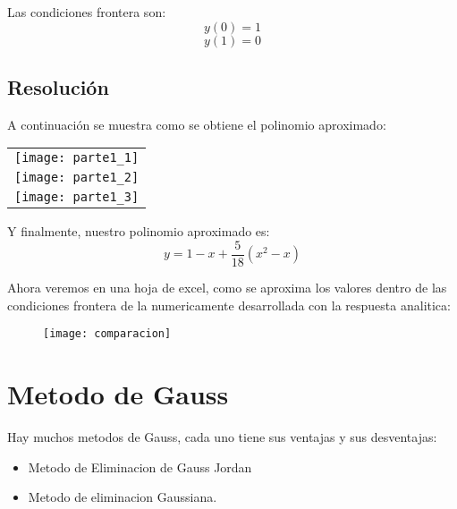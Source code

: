 \documentclass[a4paper,12pt]{article}
\begin{document}
Las condiciones frontera son:
$$y(0) = 1$$
$$y(1) = 0$$
\newpage
\subsection{Resolución}
A continuación se muestra como se obtiene el polinomio aproximado:
\begin{table}[!ht]
    \centering
    \begin{tabular}{c}
        \begin{minipage}{10cm}
            \texttt{[image: parte1\_1]}
        \end{minipage}\\
        \begin{minipage}{10cm}
            \texttt{[image: parte1\_2]}
        \end{minipage}\\
        \begin{minipage}{10cm}
            \texttt{[image: parte1\_3]}
        \end{minipage}
    \end{tabular}
\end{table}

Y finalmente, nuestro polinomio aproximado es:
\begin{equation}
    y = 1 - x + \frac{5}{18}(x^2 - x)
\end{equation}
\newpage

Ahora veremos en una hoja de excel, como se aproxima los valores
dentro de las condiciones frontera de la numericamente desarrollada con la respuesta analitica:
\begin{figure}[h]
    \centering
    \texttt{[image: comparacion]}
\end{figure}
\section{Metodo de Gauss}
Hay muchos metodos de Gauss, cada uno tiene sus ventajas y sus desventajas:
\begin{itemize}
    \item Metodo de Eliminacion de Gauss Jordan
    \item Metodo de eliminacion Gaussiana.    
\end{itemize}
\end{document}
